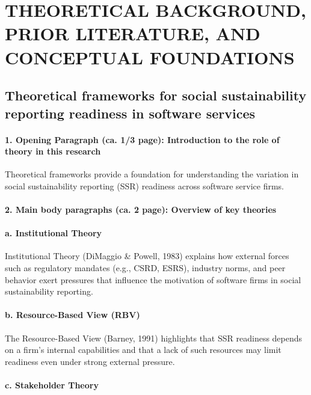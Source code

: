 \chapter{THEORETICAL BACKGROUND, PRIOR LITERATURE, AND CONCEPTUAL FOUNDATIONS}

\section{Theoretical frameworks for social sustainability reporting readiness in software services}

\subsubsection{1. Opening Paragraph (ca. 1/3 page): Introduction to the role of theory in this research}

Theoretical frameworks provide a foundation for understanding the variation 
in social sustainability reporting (SSR) readiness across software service firms.

\subsubsection{2. Main body paragraphs (ca. 2 page): Overview of key theories}

\vspace{8pt}
    \subsubsection{a. Institutional Theory}

Institutional Theory (DiMaggio \& Powell, 1983) explains how external forces such as regulatory mandates (e.g., CSRD, ESRS),
industry norms, and peer behavior exert pressures that influence the motivation of software firms in 
social sustainability reporting.

    \subsubsection{b. Resource-Based View (RBV)}

The Resource-Based View (Barney, 1991) highlights that SSR readiness depends on a firm's internal capabilities 
and that a lack of such resources may limit readiness even under strong external pressure.

    \subsubsection{c. Stakeholder Theory}

